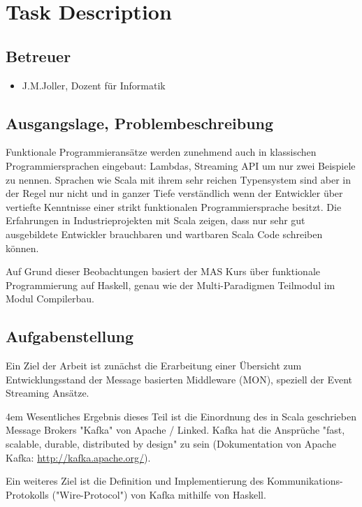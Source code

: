 \chapter{Task Description}
\section*{Betreuer}
\begin{itemize}
    \item J.M.Joller, Dozent für Informatik
\end{itemize}

\section*{Ausgangslage, Problembeschreibung}
Funktionale Programmieransätze werden zunehmend auch in klassischen
Programmiersprachen eingebaut:  Lambdas, Streaming API um nur zwei Beispiele zu
nennen. Sprachen wie Scala mit ihrem sehr reichen Typensystem sind aber in der
Regel nur nicht und in ganzer Tiefe verständlich wenn der Entwickler über
vertiefte Kenntnisse einer strikt funktionalen Programmiersprache besitzt. Die
Erfahrungen in Industrieprojekten mit Scala zeigen, dass nur sehr gut
ausgebildete Entwickler brauchbaren und wartbaren Scala Code schreiben können. 

Auf Grund dieser Beobachtungen basiert der MAS Kurs über funktionale
Programmierung auf Haskell, genau wie der Multi-Paradigmen Teilmodul im Modul
Compilerbau.

\section*{Aufgabenstellung}
Ein Ziel der Arbeit ist zunächst die Erarbeitung einer Übersicht zum
Entwicklungsstand der Message basierten Middleware (MON), speziell der Event
Streaming Ansätze. 

\par
\begingroup
\leftskip4em
\rightskip\leftskip
Wesentliches Ergebnis dieses Teil ist die Einordnung des in Scala geschrieben
Message Brokers "Kafka" von Apache / Linked. Kafka hat die Ansprüche "fast,
scalable, durable, distributed by design" zu sein (Dokumentation von Apache
Kafka: \url{http://kafka.apache.org/}).
\par
\endgroup

Ein weiteres  Ziel ist die Definition und Implementierung des
Kommunikations-Protokolls ("Wire-Protocol") von Kafka mithilfe von Haskell.

